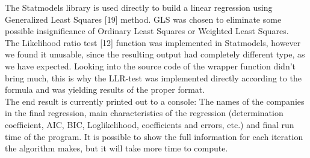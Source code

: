 \documentclass{article}
\begin{document}
The Statmodels library is used directly to build a linear regression using Generalized Least Squares [19] method. GLS was chosen to eliminate some possible insignificance of Ordinary Least Squares or Weighted Least Squares.\\
The Likelihood ratio test [12] function was implemented in Statmodels, however we found it unusable, since the resulting output had completely different type, as we have expected. Looking into the source code of the wrapper function didn't bring much, this is why the LLR-test was implemented directly according to the formula and was yielding results of the proper format.\\
The end result is currently printed out to a console: The names of the companies in the final regression, main characteristics of the regression (determination coefficient, AIC, BIC, Loglikelihood, coefficients and errors, etc.) and final run time of the program. It is possible to show the full information for each iteration the algorithm makes, but it will take more time to compute. 
\end{document}
